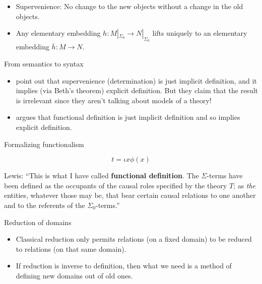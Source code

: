 \documentclass[fleqn]{beamer}
\begin{document}
\begin{frame}

  \begin{itemize}
  \item Supervenience: No change to the new objects without a change
    in the old objects.
  \item Any elementary embedding $h:M|_{\Sigma _0}\to N|_{\Sigma _0}$
    lifts uniquely to an elementary embedding $\overline{h}:M\to N$.
  \end{itemize}


\end{frame}

\begin{frame}{From semantics to syntax}

  \begin{itemize}
  \item \citet{hellman} point out that supervenience (determination)
    is just implicit definition, and it implies (via Beth's theorem)
    explicit definition. But they claim that the result is irrelevant
    since they aren't talking about models of a theory!
  \item \citet{bealer} argues that functional definition is just
    implicit definition and so implies explicit definition.
  \end{itemize}


\end{frame}

\begin{frame}{Formalizing functionalism}

  \[ t = \iota x \phi (x)  \]

  Lewis: ``This is what I have called \textbf{functional
    definition}. The $\Sigma$-terms have been defined as the occupants
  of the causal roles specified by the theory $T$; as \emph{the}
  entities, whatever those may be, that bear certain causal relations
  to one another and to the referents of the $\Sigma _0$-terms.''
  \citeyearpar[p 254]{lewis1972}
  
\end{frame}


\begin{frame}{Reduction of domains}

  \begin{itemize}
  \item Classical reduction only permits relations (on a fixed domain)
    to be reduced to relations (on that same domain).
  \item If reduction is inverse to definition, then what we need is a
    method of defining new domains out of old ones.
  \end{itemize}

\end{frame}
\end{document}
